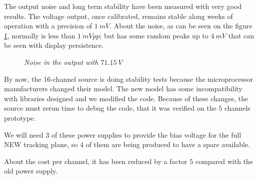 The output noise and long term stability have been measured with very good results. The voltage output, once calibrated, remains stable along weeks of operation with a precision of $1\ mV$. About the noise, as can be seen on the figure \ref{fig:noise}, normally is less than $1	\ mVpp$; but has some random peaks up to $4\ mV$ that can be seen with display persistence.

\begin{figure}[ht]
\centering
{}\label{fig:cont}
\hspace{5mm}

\caption{\textit{Noise in the output with $71.15\ V$}}
\label{fig:noise}
\end{figure}

By now, the 16-channel source is doing stability tests because the microprocessor manufacturers changed their model. The new model has some incompatibility with libraries designed and we modified the code. Because of these changes, the source must rerun time to debug the code, that it was verified on the $5$ channels prototype.

We will need $3$ of these power supplies to provide the bias voltage for the full NEW tracking plane, so $4$ of them are being produced to have a spare available.

About the cost per channel, it has been reduced by a factor $5$ compared with the old power supply.%






